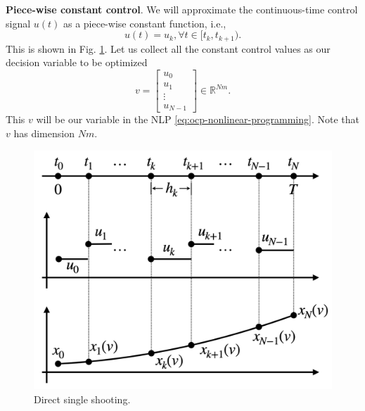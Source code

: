 \documentclass[
]{book}
\theoremstyle{definition}
\theoremstyle{definition}
\theoremstyle{definition}
\theoremstyle{definition}
\theoremstyle{remark}
\begin{document}
\textbf{Piece-wise constant control}. We will approximate the continuous-time control signal \(u(t)\) as a piece-wise constant function, i.e.,
\[
u(t) = u_k, \forall t \in [t_k, t_{k+1}).
\]
This is shown in Fig. \ref{fig:direct-single-shooting}. Let us collect all the constant control values as our decision variable to be optimized
\begin{equation}
v = \begin{bmatrix} u_0 \\ u_1 \\ \vdots \\ u_{N-1} \end{bmatrix} \in \mathbb{R}^{N m}.
\label{eq:direct-single-shooting-v}
\end{equation}
This \(v\) will be our variable in the NLP \eqref{eq:ocp-nonlinear-programming}. Note that \(v\) has dimension \(N m\).

\begin{figure}

{\centering \includegraphics[width=0.6\linewidth]{images/direct_single_shooting} 

}

\caption{Direct single shooting.}\label{fig:direct-single-shooting}
\end{figure}
\end{document}

